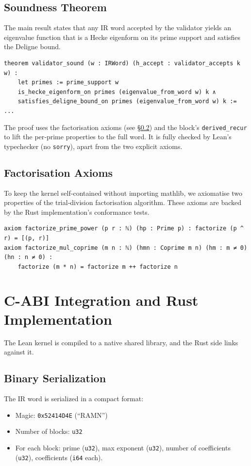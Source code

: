 \documentclass[11pt,a4paper]{article}
\begin{document}
\subsection{Soundness Theorem}
The main result states that any IR word accepted by the validator yields an eigenvalue function that is a Hecke eigenform on its prime support and satisfies the Deligne bound.

\begin{lstlisting}[language=lean, caption={Soundness theorem (simplified).}]
theorem validator_sound (w : IRWord) (h_accept : validator_accepts k w) :
    let primes := prime_support w
    is_hecke_eigenform_on primes (eigenvalue_from_word w) k ∧
    satisfies_deligne_bound_on primes (eigenvalue_from_word w) k := ...
\end{lstlisting}
The proof uses the factorisation axioms (see §\ref{axioms}) and the block's \texttt{derived\_recur} to lift the per‑prime properties to the full word. It is fully checked by Lean's typechecker (no \texttt{sorry}), apart from the two explicit axioms.

\subsection{Factorisation Axioms}
\label{axioms}
To keep the kernel self‑contained without importing mathlib, we axiomatise two properties of the trial‑division factorisation algorithm. These axioms are backed by the Rust implementation's conformance tests.

\begin{lstlisting}[language=lean, caption={Factorisation axioms.}]
axiom factorize_prime_power (p r : ℕ) (hp : Prime p) : factorize (p ^ r) = [(p, r)]
axiom factorize_mul_coprime (m n : ℕ) (hmn : Coprime m n) (hm : m ≠ 0) (hn : n ≠ 0) :
    factorize (m * n) = factorize m ++ factorize n
\end{lstlisting}

\section{C-ABI Integration and Rust Implementation}
The Lean kernel is compiled to a native shared library, and the Rust side links against it.

\subsection{Binary Serialization}
The IR word is serialized in a compact format:
\begin{itemize}
    \item Magic: \texttt{0x52414D4E} (``RAMN'')
    \item Number of blocks: \texttt{u32}
    \item For each block: prime (\texttt{u32}), max exponent (\texttt{u32}), number of coefficients (\texttt{u32}), coefficients (\texttt{i64} each).
\end{itemize}
\end{document}
